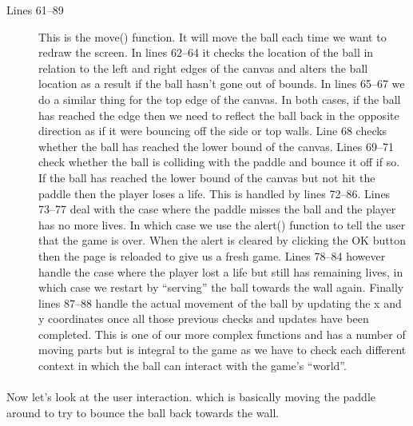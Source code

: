 \documentclass[10pt, a4paper, oneside]{article}
\begin{document}
\begin{description}
\item[Lines 61--89] This is the move() function. It will move the ball each time we want to redraw the screen. In lines 62--64 it checks the location of the ball in relation to the left and right edges of the canvas and alters the ball location as a result if the ball hasn't gone out of bounds. In lines 65--67 we do a similar thing for the top edge of the canvas. In both cases, if the ball has reached the edge then we need to reflect the ball back in the opposite direction as if it were bouncing off the side or top walls. Line 68 checks whether the ball has reached the lower bound of the canvas. Lines 69--71 check whether the ball is colliding with the paddle and bounce it off if so. If the ball has reached the lower bound of the canvas but not hit the paddle then the player loses a life. This is handled by lines 72--86. Lines 73--77 deal with the case where the paddle misses the ball and the player has no more lives. In which case we use the alert() function to tell the user that the game is over. When the alert is cleared by clicking the OK button then the page is reloaded to give us a fresh game. Lines 78--84 however handle the case where the player lost a life but still has remaining lives, in which case we restart by ``serving'' the ball towards the wall again. Finally lines 87--88 handle the actual movement of the ball by updating the x and y coordinates once all those previous checks and updates have been completed. This is one of our more complex functions and has a number of moving parts but is integral to the game as we have to check each different context in which the ball can interact with the game's ``world''.\end{description}


\paragraph{} Now let's look at the user interaction. which is basically moving the paddle around to try to bounce the ball back towards the wall.
\end{document}
